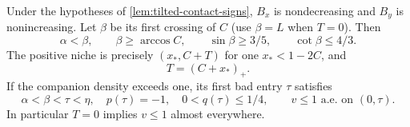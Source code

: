 \begin{lemma}
\label{lem:tilted-first-unit-geometry}
Under the hypotheses of \cref{lem:tilted-contact-signs},
$B_x$ is nondecreasing and $B_y$ is nonincreasing. Let $\beta$
be its first crossing of $C$ (use $\beta=L$ when $T=0$).
Then
\begin{equation}\label{eq:tilted-crossing-box}
 \alpha<\beta,\qquad \beta\ge\arccos C,\qquad
 \sin\beta\ge3/5,\qquad \cot\beta\le4/3.
\end{equation}
The positive niche is precisely $(x_*,C+T)$ for one
$x_*<1-2C$, and
\begin{equation}\label{eq:tilted-no-ghost-projection}
 T=(C+x_*)_+.
\end{equation}
If the companion density exceeds one, its first bad entry
$\tau$ satisfies
\begin{equation}\label{eq:tilted-first-bad-bound}
 \alpha<\beta<\tau<\eta,\quad
 p(\tau)=-1,\quad 0<q(\tau)\le1/4,
 \qquad v\le1\text{ a.e. on }(0,\tau).
\end{equation}
In particular $T=0$ implies $v\le1$ almost everywhere.
\end{lemma}
